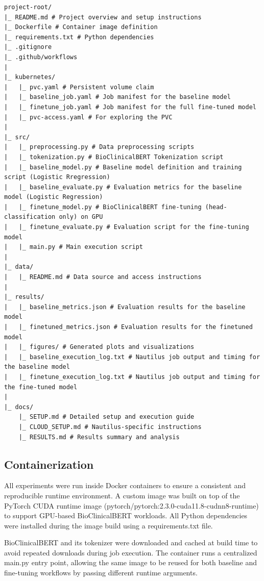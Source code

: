 \documentclass[11pt]{article}
\begin{document}
\begin{verbatim}
project-root/
|_ README.md # Project overview and setup instructions
|_ Dockerfile # Container image definition
|_ requirements.txt # Python dependencies
|_ .gitignore
|_ .github/workflows
|
|_ kubernetes/
|   |_ pvc.yaml # Persistent volume claim
|   |_ baseline_job.yaml # Job manifest for the baseline model
|   |_ finetune_job.yaml # Job manifest for the full fine-tuned model
|   |_ pvc-access.yaml # For exploring the PVC
|
|_ src/
|   |_ preprocessing.py # Data preprocessing scripts
|   |_ tokenization.py # BioClinicalBERT Tokenization script
|   |_ baseline_model.py # Baseline model definition and training script (Logistic Rregression)
|   |_ baseline_evaluate.py # Evaluation metrics for the baseline model (Logistic Regression)
|   |_ finetune_model.py # BioClinicalBERT fine-tuning (head-classification only) on GPU
|   |_ finetune_evaluate.py # Evaluation script for the fine-tuning model
|   |_ main.py # Main execution script
|
|_ data/
|   |_ README.md # Data source and access instructions
|
|_ results/
|   |_ baseline_metrics.json # Evaluation results for the baseline model
|   |_ finetuned_metrics.json # Evaluation results for the finetuned model
|   |_ figures/ # Generated plots and visualizations
|   |_ baseline_execution_log.txt # Nautilus job output and timing for the baseline model
|   |_ finetune_execution_log.txt # Nautilus job output and timing for the fine-tuned model
|
|_ docs/
    |_ SETUP.md # Detailed setup and execution guide
    |_ CLOUD_SETUP.md # Nautilus-specific instructions
    |_ RESULTS.md # Results summary and analysis
\end{verbatim}


\subsection{Containerization}

All experiments were run inside Docker containers to ensure a consistent and reproducible runtime environment. A custom image was built on top of the PyTorch CUDA runtime image (pytorch/pytorch:2.3.0-cuda11.8-cudnn8-runtime) to support GPU-based BioClinicalBERT workloads. All Python dependencies were installed during the image build using a requirements.txt file.

BioClinicalBERT and its tokenizer were downloaded and cached at build time to avoid repeated downloads during job execution. The container runs a centralized main.py entry point, allowing the same image to be reused for both baseline and fine-tuning workflows by passing different runtime arguments.
\end{document}
